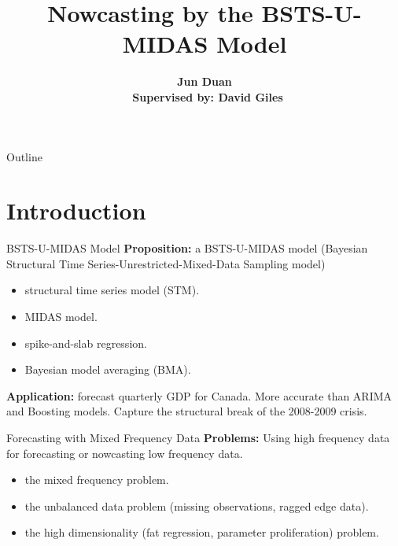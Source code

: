 \documentclass[14pt,xcolor=dvipsnames]{beamer}
\title{Nowcasting by the BSTS-U-MIDAS Model}
\author[Jun Duan]{\textbf {Jun Duan\\\ \footnotesize Supervised by: David Giles}} %
\begin{document}
\begin{frame}
\titlepage
\end{frame}

\begin{frame}{Outline}
\tableofcontents
\end{frame}

\section{Introduction}



\begin{frame}{BSTS-U-MIDAS Model}
	\textbf{Proposition:}  a BSTS-U-MIDAS model (Bayesian
	Structural Time Series-Unrestricted-Mixed-Data Sampling model)
	
	\begin{itemize}%
		\item structural time series model (STM).
		\item MIDAS model.
		\item spike-and-slab regression.
		\item Bayesian model averaging (BMA).
	\end{itemize}
	
	\textbf{Application:} forecast quarterly GDP for Canada. 
	More accurate than ARIMA  and Boosting models. Capture the structural break of the 2008-2009 crisis. 
	
\end{frame}

\begin{frame}{Forecasting with Mixed Frequency Data}
\textbf{Problems:} Using high frequency data for forecasting or nowcasting low frequency data.

\begin{itemize}%
\item the mixed frequency problem.
\item  the unbalanced data problem (missing
observations, ragged edge data).
\item the high dimensionality (fat regression, parameter proliferation) problem.

\end{itemize}

\end{frame}






\end{document}
